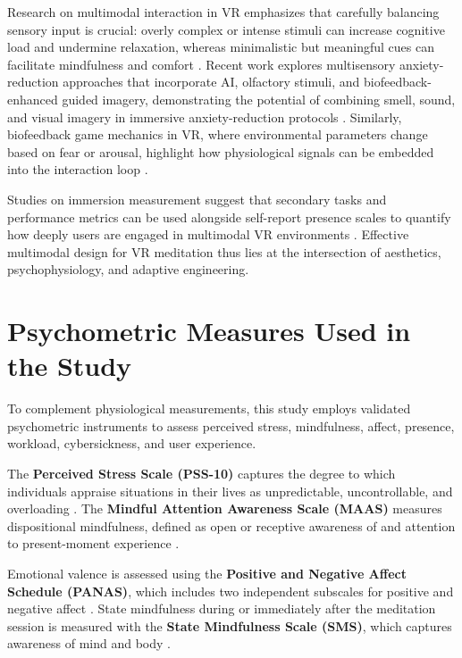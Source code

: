 Research on multimodal interaction in VR emphasizes that carefully balancing sensory input is crucial: overly complex or intense stimuli can increase cognitive load and undermine relaxation, whereas minimalistic but meaningful cues can facilitate mindfulness and comfort \cite{martin2019multimodal,freeman2017virtual}. Recent work explores multisensory anxiety-reduction approaches that incorporate AI, olfactory stimuli, and biofeedback-enhanced guided imagery, demonstrating the potential of combining smell, sound, and visual imagery in immersive anxiety-reduction protocols \cite{aimagery2023olfactory}. Similarly, biofeedback game mechanics in VR, where environmental parameters change based on fear or arousal, highlight how physiological signals can be embedded into the interaction loop \cite{houzangbe2018biofeedback}.

Studies on immersion measurement suggest that secondary tasks and performance metrics can be used alongside self-report presence scales to quantify how deeply users are engaged in multimodal VR environments \cite{payne2024immersion}. Effective multimodal design for VR meditation thus lies at the intersection of aesthetics, psychophysiology, and adaptive engineering.

\section{Psychometric Measures Used in the Study}

To complement physiological measurements, this study employs validated psychometric instruments to assess perceived stress, mindfulness, affect, presence, workload, cybersickness, and user experience.

The \textbf{Perceived Stress Scale (PSS-10)} captures the degree to which individuals appraise situations in their lives as unpredictable, uncontrollable, and overloading \cite{cohen1983pss}. The \textbf{Mindful Attention Awareness Scale (MAAS)} measures dispositional mindfulness, defined as open or receptive awareness of and attention to present-moment experience \cite{brown2003maas}. 

Emotional valence is assessed using the \textbf{Positive and Negative Affect Schedule (PANAS)}, which includes two independent subscales for positive and negative affect \cite{watson1988panas}. State mindfulness during or immediately after the meditation session is measured with the \textbf{State Mindfulness Scale (SMS)}, which captures awareness of mind and body \cite{tanay2013sms}. 

